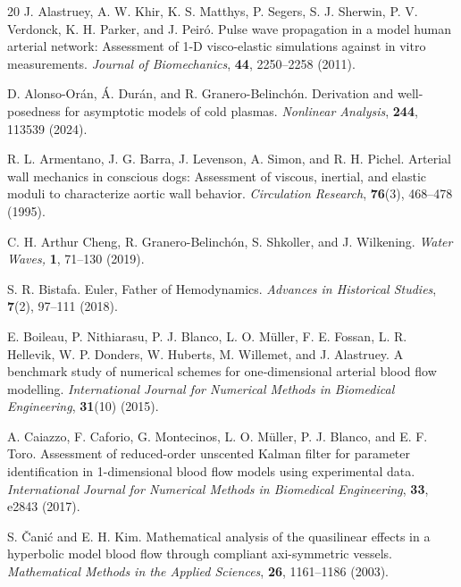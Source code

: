 \documentclass[reqno]{amsart}
\theoremstyle{definition}
\numberwithin{equation}{section}
\numberwithin{theorem}{section}
\numberwithin{definition}{section}
\begin{document}
\begin{thebibliography}{20}
J. Alastruey, A. W. Khir, K. S. Matthys, P. Segers, S. J. Sherwin, P. V. Verdonck, K. H. Parker, and J. Peiró.
\newblock Pulse wave propagation in a model human arterial network: Assessment of 1-D visco-elastic simulations against in vitro measurements.
\newblock \textit{Journal of Biomechanics}, \textbf{44}, 2250--2258 (2011).


D. Alonso-Orán, Á. Durán, and R. Granero-Belinchón.
\newblock Derivation and well-posedness for asymptotic models of cold plasmas.
\newblock \textit{Nonlinear Analysis}, \textbf{244}, 113539 (2024).

R. L. Armentano, J. G. Barra, J. Levenson, A. Simon, and R. H. Pichel.
\newblock Arterial wall mechanics in conscious dogs: Assessment of viscous, inertial, and elastic moduli to characterize aortic wall behavior.
\newblock \textit{Circulation Research}, \textbf{76}(3), 468--478 (1995).


 C. H. Arthur Cheng, R. Granero-Belinchón, S. Shkoller, and J. Wilkening. 
\newblock \textit {Water Waves,} {\bf 1}, 71--130 (2019).

S. R. Bistafa.
\newblock Euler, Father of Hemodynamics.
\newblock \textit{Advances in Historical Studies}, \textbf{7}(2), 97--111 (2018).


E. Boileau, P. Nithiarasu, P. J. Blanco, L. O. Müller, F. E. Fossan, L. R. Hellevik, W. P. Donders, W. Huberts, M. Willemet, and J. Alastruey.
\newblock A benchmark study of numerical schemes for one‐dimensional arterial blood flow modelling.
\newblock \textit{International Journal for Numerical Methods in Biomedical Engineering}, \textbf{31}(10) (2015).


A. Caiazzo, F. Caforio, G. Montecinos, L. O. Müller, P. J. Blanco, and E. F. Toro.
\newblock Assessment of reduced-order unscented Kalman filter for parameter identification in 1-dimensional blood flow models using experimental data.
\newblock \textit{International Journal for Numerical Methods in Biomedical Engineering}, \textbf{33}, e2843 (2017).


S. Čanić and E. H. Kim.
\newblock Mathematical analysis of the quasilinear effects in a hyperbolic model blood flow through compliant axi-symmetric vessels.
\newblock \textit{Mathematical Methods in the Applied Sciences}, \textbf{26}, 1161--1186 (2003).


\end{thebibliography}
\end{document}
